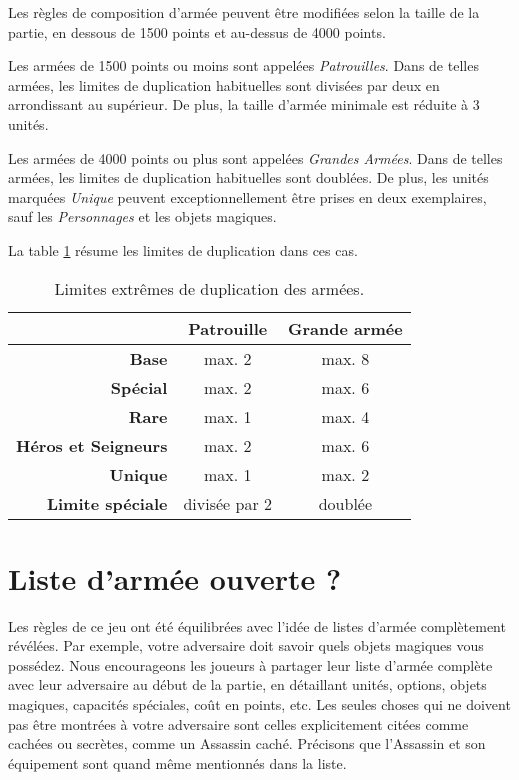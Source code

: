 Les règles de composition d'armée peuvent être modifiées selon la taille de la partie, en dessous de 1500 points et au-dessus de 4000 points.

Les armées de 1500 points ou moins sont appelées \emph{Patrouilles}. Dans de telles armées, les limites de duplication habituelles sont divisées par deux en arrondissant au supérieur. De plus, la taille d'armée minimale est réduite à 3 unités.

Les armées de 4000 points ou plus sont appelées \emph{Grandes Armées}. Dans de telles armées, les limites de duplication habituelles sont doublées. De plus, les unités marquées \emph{Unique} peuvent exceptionnellement être prises en deux exemplaires, sauf les \emph{Personnages} et les objets magiques.

La table \ref{table/patrouille_et_grande_armee} résume les limites de duplication dans ces cas.

\begin{table}[!htbp]
\centering
\begin{tabular}{rcc}
\hline
 							& \textbf{Patrouille} 	& \textbf{Grande armée} \tabularnewline
\hline
\textbf{Base} 				& max. 2	 			& max. 8	 			\tabularnewline
\textbf{Spécial} 			& max. 2	 			& max. 6	 			\tabularnewline
\textbf{Rare} 				& max. 1	 			& max. 4	 			\tabularnewline
\textbf{Héros et Seigneurs} & max. 2	 			& max. 6	 			\tabularnewline
\textbf{Unique}			    & max. 1	 			& max. 2	 			\tabularnewline
\textbf{Limite spéciale} 	& divisée par 2			& doublée				\tabularnewline
\hline
\end{tabular}
\caption{\label{table/patrouille_et_grande_armee}Limites extrêmes de duplication des armées.}
\end{table}

\section{Liste d'armée ouverte ?}

Les règles de ce jeu ont été équilibrées avec l'idée de listes d'armée complètement révélées. Par exemple, votre adversaire doit savoir quels objets magiques vous possédez. Nous encourageons les joueurs à partager leur liste d'armée complète avec leur adversaire au début de la partie, en détaillant unités, options, objets magiques, capacités spéciales, coût en points, etc. Les seules choses qui ne doivent pas être montrées à votre adversaire sont celles explicitement citées comme cachées ou secrètes, comme un Assassin caché. Précisons que l'Assassin et son équipement sont quand même mentionnés dans la liste.

